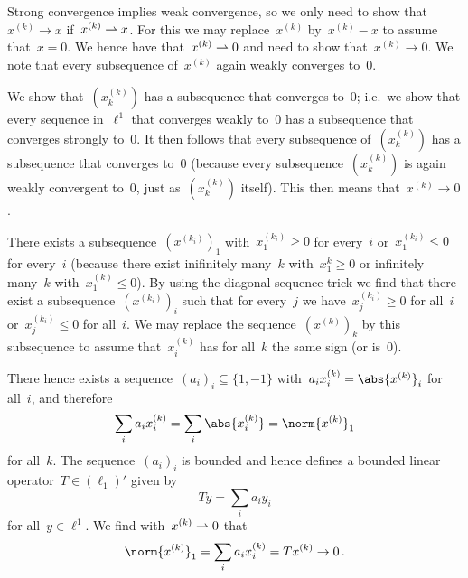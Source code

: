 Strong convergence implies weak convergence, so we only need to show that~$x^{(k)} \to x$ if~$x^{(k)} \rightharpoonup x$.
For this we may replace~$x^{(k)}$ by~$x^{(k)} - x$ to assume that~$x = 0$.
We hence have that~$x^{(k)} \rightharpoonup 0$ and need to show that~$x^{(k)} \to 0$.
We note that every subsequence of~$x^{(k)}$ again weakly converges to~$0$.

We show that~$(x^{(k)}_k)$ has a subsequence that converges to~$0$;
i.e.\ we show that every sequence in~$\ell^1$ that converges weakly to~$0$ has a subsequence that converges strongly to~$0$.
It then follows that every subsequence of~$(x^{(k)}_k)$ has a subsequence that converges to~$0$ (because every subsequence~$(x^{(k)}_k)$ is again weakly convergent to~$0$, just as~$(x^{(k)}_k)$ itself).
This then means that~$x^{(k)} \to 0$.

There exists a subsequence~$(x^{(k_i)})_1$ with~$x^{(k_i)}_1 \geq 0$ for every~$i$ or~$x^{(k_i)}_1 \leq 0$ for every~$i$ (because there exist inifinitely many~$k$ with~$x^k_1 \geq 0$ or infinitely many~$k$ with~$x^{(k)}_1 \leq 0$).
By using the diagonal sequence trick we find that there exist a subsequence~$(x^{(k_i)})_i$ such that for every~$j$ we have~$x^{(k_i)}_j \geq 0$ for all~$i$ or~$x^{(k_i)}_j \leq 0$ for all~$i$.
We may replace the sequence~$(x^{(k)})_k$ by this subsequence to assume that~$x^{(k)}_i$ has for all~$k$ the same sign (or is~$0$).

There hence exists a sequence~$(a_i)_i \subseteq \{1,-1\}$ with~$a_i x^{(k)}_i = \abs{x^{(k)}}_i$ for all~$i$, and therefore
\[
  \sum_i a_i x^{(k)}_i
  =
  \sum_i \abs{x^{(k)}_i}
  =
  \norm{ x^{(k)} }_1
\]
for all~$k$.
The sequence~$(a_i)_i$ is bounded and hence defines a bounded linear operator~$T \in (\ell_1)'$ given by
\[
  T y
  =
  \sum_i a_i y_i
\]
for all~$y \in \ell^1$.
We find with~$x^{(k)} \rightharpoonup 0$ that
\[
  \norm{ x^{(k)} }_1
  =
  \sum_i a_i x^{(k)}_i
  =
  T x^{(k)}
  \to
  0 \,.
\]




